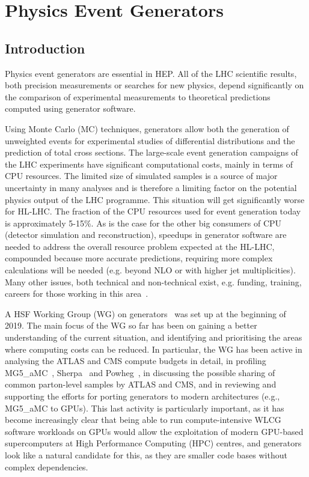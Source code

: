
\hypertarget{physics-event-generators}{%
\section{Physics Event Generators}\label{physics-event-generators}}

\hypertarget{introduction-1}{%
\subsection{Introduction}\label{introduction-1}}

Physics event generators are essential in HEP. All of the LHC scientific
results, both precision measurements or searches for new physics, depend
significantly on the comparison of experimental measurements to
theoretical predictions computed using generator software.

Using Monte Carlo (MC) techniques, generators allow both the generation
of unweighted events for experimental studies of differential
distributions and the prediction of total cross sections. The
large-scale event generation campaigns of the LHC experiments have
significant computational costs, mainly in terms of CPU resources. The
limited size of simulated samples is a source of major uncertainty in
many analyses and is therefore a limiting factor on the potential
physics output of the LHC programme. This situation will get
significantly worse for 
HL-LHC. The fraction of the CPU resources used for event generation today is approximately 5-15\%. 
As is the case for the other big
consumers of CPU (detector simulation and reconstruction), speedups in generator software are
needed to address the overall resource problem expected at the HL-LHC,
compounded because more accurate predictions, requiring more complex
calculations will be
needed (e.g. beyond NLO or with higher jet multiplicities). Many other issues, both technical and
non-technical exist, e.g. funding, training, careers for those working in this
area~\cite{Alves:2017she,Gen18}.

A HSF Working Group (WG) on generators~\cite{Gen19} was set up at the
beginning of 2019. The main focus of the WG so far has been on gaining a
better understanding of the current situation, and identifying and
prioritising the areas where computing costs can be reduced. In
particular, the WG has been active in analysing the ATLAS and CMS
compute budgets in detail, in profiling MG5\_aMC~\cite{Alw14}, 
Sherpa~\cite{Bot19} and Powheg~\cite{Fri07}, in discussing the possible sharing
of common parton-level samples by ATLAS and CMS, and in reviewing and
supporting the efforts for porting generators to modern architectures
(e.g., MG5\_aMC to GPUs). This last activity is particularly important,
as it has become increasingly clear that being able to run
compute-intensive WLCG software workloads on GPUs would allow the
exploitation of modern GPU-based supercomputers at High Performance
Computing (HPC) centres, and generators look like a natural candidate
for this, as they are smaller code bases without complex dependencies.

